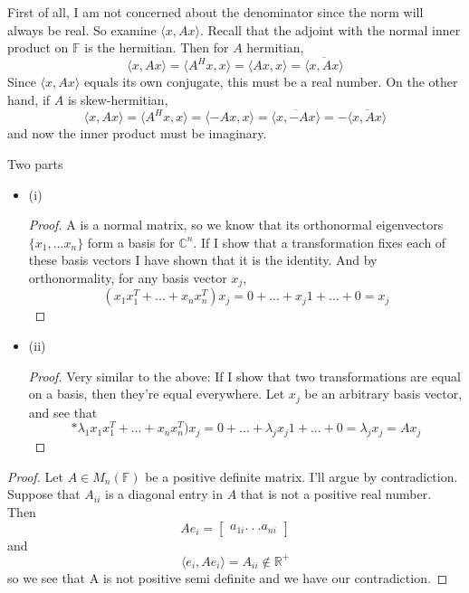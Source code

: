 \documentclass[12pt]{amsart}
\newenvironment{problem}[2][Problem]{\begin{trivlist}
\item[\hskip \labelsep {\bfseries #1}\hskip \labelsep {\bfseries #2.}]}{\end{trivlist}}
\begin{document}
\begin{problem}{24}
First of all, I am not concerned about the denominator since the norm will always be real. So examine $\langle x, Ax \rangle$. Recall that the adjoint with the normal inner product on $\mathbb{F}$ is the hermitian. Then for $A$ hermitian,
$$ \langle x, Ax \rangle = \langle A^Hx, x \rangle = \langle Ax, x \rangle = \overline{\langle x, Ax \rangle} $$
Since $\langle x,Ax \rangle$ equals its own conjugate, this must be a real number. On the other hand, if $A$ is skew-hermitian,
$$ \langle x, Ax \rangle = \langle A^Hx, x \rangle = \langle -Ax, x \rangle = \overline{\langle x, -Ax \rangle} = - \overline{\langle x, Ax \rangle} $$
and now the inner product must be imaginary.
\end{problem}

\begin{problem}{25} Two parts
\begin{itemize}
\item (i) \begin{proof}
A is a normal matrix, so we know that its orthonormal eigenvectors $\{ x_1, ... x_n \}$ form a basis for $\mathbb{C}^n$. If I show that a transformation fixes each of these basis vectors I have shown that it is the identity. And by orthonormality, for any basis vector $x_j$,
$$
(x_1x_1^T + ... + x_nx_n^T)x_j = 0 +... + x_j1 + ... + 0 = x_j
$$
\end{proof}
\item (ii)
\begin{proof}
Very similar to the above: If I show that two transformations are equal on a basis, then they're equal everywhere. Let $x_j$ be an arbitrary basis vector, and see that
$$*\lambda_1 x_1x_1^T + ... + x_nx_n^T)x_j = 0+ ... + \lambda_j x_j 1+... + 0 = \lambda_j x_j = Ax_j
$$
\end{proof}
\end{itemize}
\end{problem}

\begin{problem}{27}
\begin{proof}
Let $A \in M_n(\mathbb{F})$ be a positive definite matrix. I'll argue by contradiction. Suppose that $A_{ii}$ is a diagonal entry in $A$ that is not a positive real number. Then
$$
A e_i = \begin{bmatrix}
a_{1i}
. \
. \
.
a_{ni}
\end{bmatrix}
$$
and
$$ \langle e_i, Ae_i \rangle = A_{ii} \notin \mathbb{R}^+ $$
so we see that A is not positive semi definite and we have our contradiction.
\end{proof}
\end{problem}
\end{document}
